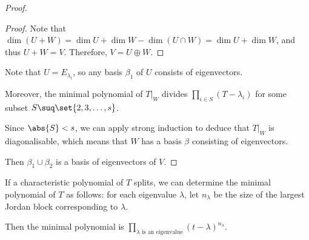 \documentclass[11pt]{scrartcl}
\begin{document}
\begin{proof}
\begin{proof}
    Note that
    $\dim(U+W) = \dim U + \dim W - \dim(U\cap W) = \dim U+\dim W$, and
    thus $U+W = V$. Therefore, $V = U \oplus W$.
  \end{proof}

  Note that $U = E_{\lambda_i}$, so any basis $\beta_1$ of $U$
  consists of eigenvectors.

  Moreover, the minimal polynomial of $T|_W$ divides $\prod _{i\in S}(T-\lambda_i)$ for some subset $S\suq \set{2, 3, \dots, s}$.

  Since $\abs{S}<s$, we can apply strong induction to deduce that
  $T|_W$ is diagonalisable, which means that $W$ has a basis $\beta$
  consisting of eigenvectors.

  Then $\beta_1\cup \beta_2$ is a basis of eigenvectors of $V$.

\end{proof}

\begin{corollary}
  If a characteristic polynomial of $T$ splits, we can determine the
  minimal polynomial of $T$ as follows: for each eigenvalue $\lambda$,
  let $n_{\lambda}$ be the size of the largest Jordan block
  corresponding to $\lambda$.

  Then the minimal polynomial is
  $\prod_{\lambda \text{ is an eigenvalue}}(t
  -\lambda)^{n_{\lambda}}$.
\end{corollary}
\end{document}
